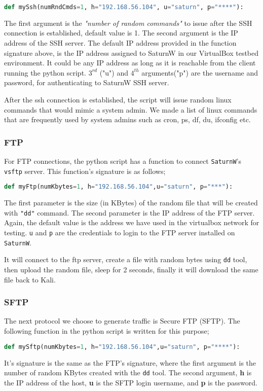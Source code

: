 \documentclass[a4paper]{article}
\begin{document}
\begin{lstlisting}[language=Python, basicstyle=\footnotesize,numbers=none]
def mySsh(numRndCmds=1, h="192.168.56.104", u="saturn", p="****"):
\end{lstlisting}

The first argument is the \textit{"number of random commands"} to issue after the SSH connection is established, default value is 1. 
The second argument is the IP address of the SSH server. 
The default IP address provided in the function signature above, is the IP address assigned to SaturnW in our VirtualBox testbed environment. 
It could be any IP address as long as it is reachable from the client running the python script. 
$3^{rd}$ ("u") and $4^{th}$ arguments("p") are the username and password, for authenticating to SaturnW SSH server.

After the ssh connection is established, the script will issue random linux commands that would mimic a system admin. 
We made a list of linux commands that are frequently used by system admins such as cron, ps, df, du, ifconfig etc.~\cite{lnxcmd1,lnxcmd2}

\subsubsection{FTP}
For FTP connections, the python script has a function to connect \texttt{SaturnW}'s \texttt{vsftp} server.
This function's signature is as follows;
\begin{lstlisting}[language=Python, numbers=none]
def myFtp(numKbytes=1, h="192.168.56.104",u="saturn", p="***"):
\end{lstlisting}
The first parameter is the size (in KBytes) of the random file that will be created with \texttt{"dd"} command. 
The second parameter is the IP address of the FTP server. 
Again, the default value is the address we have used in the virtualbox network for testing.
\texttt{u} and \texttt{p} are the credentials to login to the FTP server installed on \texttt{SaturnW}.

It will connect to the ftp server, create a file with random bytes using \texttt{dd} tool, 
then upload the random file, sleep for 2 seconds, finally it will download the same file back to Kali.


\subsubsection{SFTP}
The next protocol we choose to generate traffic is Secure FTP (SFTP). 
The following function in the python script is written for this purpose;
\begin{lstlisting}[language=Python, numbers=none]
def mySftp(numKbytes=1, h="192.168.56.104",u="saturn", p="****"):
\end{lstlisting}
It's signature is the same as the FTP's signature, where the first argument is the number of random KBytes created with the  \texttt{dd} tool.
The second argument, \textbf{h} is the IP address of the host, \textbf{u} is the SFTP login username, and \textbf{p} is the password.
\end{document}
